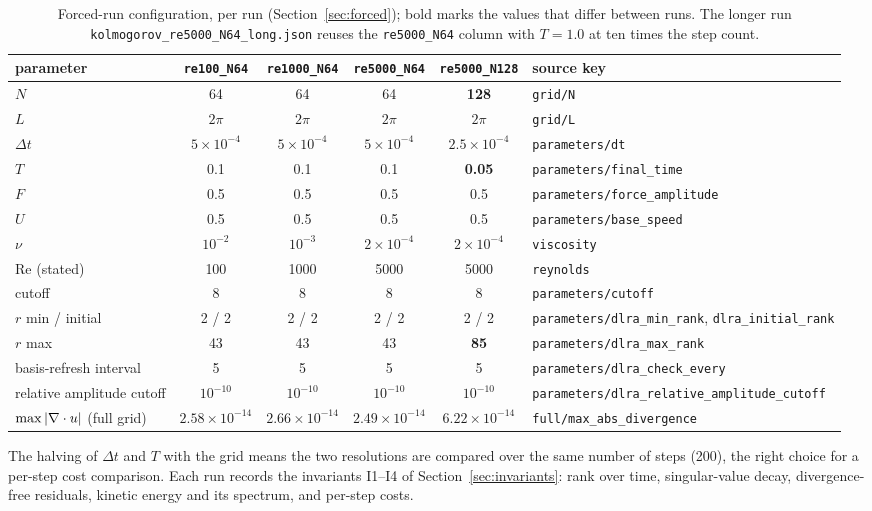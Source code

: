 \begin{table}[t]
\centering
\caption{Forced-run configuration, per run (Section~\ref{sec:forced}); bold
marks the values that differ between runs. The longer run
\texttt{kolmogorov\_re5000\_N64\_long.json} reuses the
\texttt{re5000\_N64} column with $T = 1.0$ at ten times the step count.}
\label{tab:forced-params}
\small
\begin{tabular}{lccccl}
\toprule
parameter
  & \texttt{re100\_N64}
  & \texttt{re1000\_N64}
  & \texttt{re5000\_N64}
  & \texttt{re5000\_N128}
  & source key \\
\midrule
$N$ & 64 & 64 & 64 & \textbf{128} & \texttt{grid/N} \\
$L$ & $2\pi$ & $2\pi$ & $2\pi$ & $2\pi$ & \texttt{grid/L} \\
$\Delta t$ & $5\times10^{-4}$ & $5\times10^{-4}$ & $5\times10^{-4}$
  & \textbf{$2.5\times10^{-4}$} & \texttt{parameters/dt} \\
$T$ & 0.1 & 0.1 & 0.1 & \textbf{0.05} & \texttt{parameters/final\_time} \\
$F$ & 0.5 & 0.5 & 0.5 & 0.5 & \texttt{parameters/force\_amplitude} \\
$U$ & 0.5 & 0.5 & 0.5 & 0.5 & \texttt{parameters/base\_speed} \\
$\nu$ & \textbf{$10^{-2}$} & \textbf{$10^{-3}$} & \textbf{$2\times10^{-4}$}
  & $2\times10^{-4}$ & \texttt{viscosity} \\
$\mathrm{Re}$ (stated) & 100 & 1000 & 5000 & 5000 & \texttt{reynolds} \\
cutoff & 8 & 8 & 8 & 8 & \texttt{parameters/cutoff} \\
$r$ min / initial & 2 / 2 & 2 / 2 & 2 / 2 & 2 / 2
  & \texttt{parameters/dlra\_min\_rank}, \texttt{dlra\_initial\_rank} \\
$r$ max & 43 & 43 & 43 & \textbf{85} & \texttt{parameters/dlra\_max\_rank} \\
basis-refresh interval & 5 & 5 & 5 & 5
  & \texttt{parameters/dlra\_check\_every} \\
relative amplitude cutoff & $10^{-10}$ & $10^{-10}$ & $10^{-10}$ & $10^{-10}$
  & \texttt{parameters/dlra\_relative\_amplitude\_cutoff} \\
$\max|\nabla\cdot u|$ (full grid) & $2.58\times10^{-14}$ & $2.66\times10^{-14}$
  & $2.49\times10^{-14}$ & \textbf{$6.22\times10^{-14}$}
  & \texttt{full/max\_abs\_divergence} \\
\bottomrule
\end{tabular}
\end{table}
The halving of $\Delta t$ and $T$ with the grid means the two resolutions are
compared over the same number of steps (200), the right choice for a
per-step cost comparison. Each run records the invariants I1--I4 of
Section~\ref{sec:invariants}: rank over time, singular-value decay,
divergence-free residuals, kinetic energy and its spectrum, and per-step
costs.

